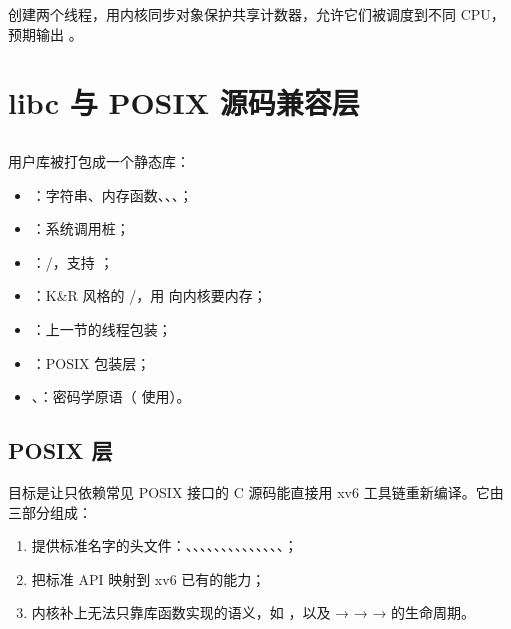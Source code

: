  创建两个线程，用内核同步对象保护共享计数器，允许它们被调度到不同 CPU，预期输出 。

\section{libc 与 POSIX 源码兼容层}
\label{sec:posix}

\subsection{}

用户库被打包成一个静态库：

\begin{itemize}
  \item {}：字符串、内存函数、、、；
  \item {}：系统调用桩；
  \item {}：/，支持 ；
  \item {}：K\&R 风格的 /，用  向内核要内存；
  \item {}：上一节的线程包装；
  \item {}：POSIX 包装层；
  \item {}、：密码学原语（ 使用）。
\end{itemize}

\subsection{POSIX 层}

目标是让只依赖常见 POSIX 接口的 C 源码能直接用 xv6 工具链重新编译。它由三部分组成：

\begin{enumerate}
  \item {} 提供标准名字的头文件：、、、、、、、、、、、、、、；
  \item {} 把标准 API 映射到 xv6 已有的能力；
  \item 内核补上无法只靠库函数实现的语义，如 ，以及  →  →  →  的生命周期。
\end{enumerate}

